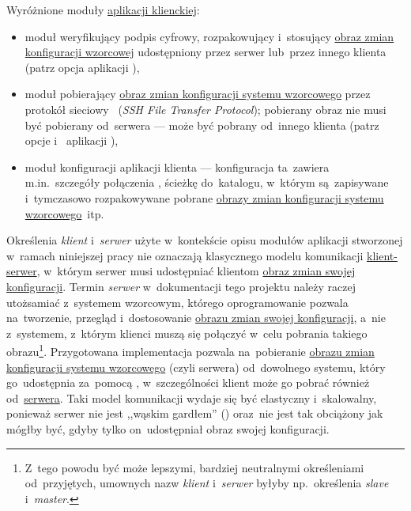 \documentclass[thesis]{subfiles}
\begin{document}
Wyróżnione moduły \hyperref[sec:cli-app]{aplikacji klienckiej}:\mynobreakpar
\begin{itemize}
	\item moduł weryfikujący podpis cyfrowy, rozpakowujący i~stosujący \hyperref[sec:obraz-zmian-konfiguracji]{obraz zmian konfiguracji wzorcowej} udostępniony przez serwer lub~przez innego klienta (patrz opcja  aplikacji \texttt{\cliappname{}}),
	\item moduł pobierający \hyperref[sec:obraz-zmian-konfiguracji]{obraz zmian konfiguracji systemu wzorcowego} przez protokół sieciowy \sftp{}~(\emph{SSH File Transfer Protocol}); pobierany obraz nie musi być pobierany od~serwera --- może być pobrany od~innego klienta (patrz opcje  i~ aplikacji \texttt{\cliappname{}}),
	\item moduł konfiguracji aplikacji klienta --- konfiguracja ta~zawiera m.in.~szczegóły połączenia \sftp{}, ścieżkę do~katalogu, w~którym są~zapisywane i~tymczasowo rozpakowywane pobrane \hyperref[sec:obraz-zmian-konfiguracji]{obrazy zmian konfiguracji systemu wzorcowego}~itp.
\end{itemize}

Określenia \emph{klient} i~\emph{serwer} użyte w~kontekście opisu modułów aplikacji stworzonej w~ramach niniejszej pracy nie oznaczają klasycznego modelu komunikacji \href{https://en.wikipedia.org/wiki/Client\%E2\%80\%93server\_model}{klient-serwer}, w~którym serwer musi udostępniać klientom \hyperref[sec:obraz-zmian-konfiguracji]{obraz zmian swojej konfiguracji}. Termin \emph{serwer} w~dokumentacji tego projektu należy raczej utożsamiać z~systemem wzorcowym, którego oprogramowanie pozwala na~tworzenie, przegląd i~dostosowanie \hyperref[sec:obraz-zmian-konfiguracji]{obrazu zmian swojej konfiguracji}, a~nie z~systemem, z~którym klienci muszą się połączyć w~celu pobrania takiego obrazu\footnote{Z~tego powodu być może lepszymi, bardziej neutralnymi określeniami od~przyjętych, umownych nazw \emph{klient} i~\emph{serwer} byłyby np.~określenia \emph{slave} i~\emph{master}.}. Przygotowana implementacja pozwala na~pobieranie \hyperref[sec:obraz-zmian-konfiguracji]{obrazu zmian konfiguracji systemu wzorcowego} (czyli serwera) od~dowolnego systemu, który go~udostępnia za~pomocą \sftp{}, w~szczególności klient może go pobrać również od~\hyperref[sec:srv-app]{serwera}. Taki model komunikacji wydaje się być elastyczny i~skalowalny, ponieważ serwer nie jest ,,wąskim gardłem'' () oraz~nie jest tak obciążony jak mógłby być, gdyby tylko on~udostępniał obraz swojej konfiguracji.
\end{document}
